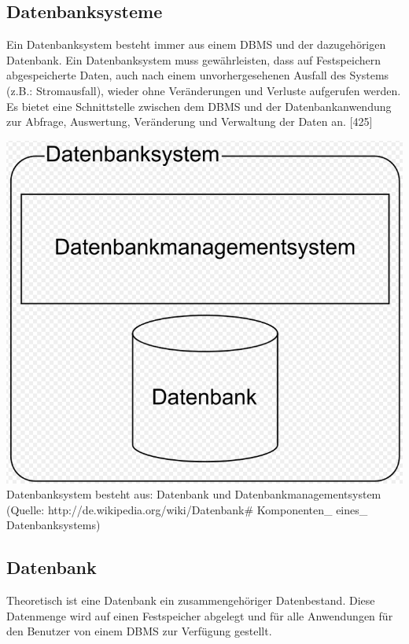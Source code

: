 \documentclass[12pt,a4paper]{report}
\begin{document}
\begin{onehalfspace}
\section{Datenbanksysteme}
Ein Datenbanksystem besteht immer aus einem DBMS und der dazugehörigen Datenbank. Ein Datenbanksystem muss gewährleisten, dass auf Festspeichern abgespeicherte Daten, auch nach einem unvorhergesehenen Ausfall des Systems (z.B.: Stromausfall), wieder ohne Veränderungen und Verluste aufgerufen werden.\\
Es bietet eine Schnittstelle zwischen dem DBMS und der Datenbankanwendung zur  Abfrage, Auswertung, Veränderung und Verwaltung der Daten an. [425]

\begin{center}
\includegraphics[scale=0.3]{img/dbs.png}\\
Datenbanksystem besteht aus: Datenbank und Datenbankmanagementsystem (Quelle: http://de.wikipedia.org/wiki/Datenbank\# Komponenten\_ eines\_ Datenbanksystems)
\end{center}

\subsection{Datenbank}
Theoretisch ist eine Datenbank ein zusammengehöriger Datenbestand. 
Diese Datenmenge wird auf einen Festspeicher abgelegt und für alle Anwendungen für den Benutzer von einem DBMS zur Verfügung gestellt.\\


\end{onehalfspace}
\end{document}
